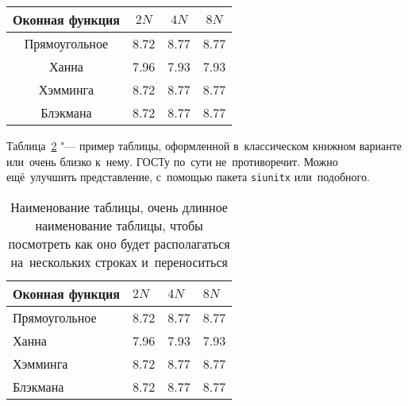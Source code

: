 \begin{table} [htbp]%
  \centering
  \begin{threeparttable}%
    \caption{}%
    \label{tab:test1}%
    \begin{SingleSpace}
      \begin{tabular}{| c | c | c | c |}
        \hline
        Оконная функция & \({2N}\)& \({4N}\)& \({8N}\)\\ \hline
        Прямоугольное   & 8.72  & 8.77  & 8.77  \\ \hline
        Ханна           & 7.96  & 7.93  & 7.93  \\ \hline
        Хэмминга        & 8.72  & 8.77  & 8.77  \\ \hline
        Блэкмана        & 8.72  & 8.77  & 8.77  \\ \hline
      \end{tabular}%
    \end{SingleSpace}
  \end{threeparttable}
\end{table}

Таблица~\ref{tab:test2} "--- пример таблицы, оформленной в~классическом книжном
варианте или~очень близко к~нему. \mbox{ГОСТу} по~сути не~противоречит. Можно
ещё~улучшить представление, с~помощью пакета \verb|siunitx| или~подобного.

\begin{table} [htbp]%
    \centering
    \caption{Наименование таблицы, очень длинное наименование таблицы, чтобы посмотреть как оно будет располагаться на~нескольких строках и~переноситься}%
    \label{tab:test2}%
    \renewcommand{\arraystretch}{1.5}%
    \begin{SingleSpace}
        \begin{tabular}{@{}@{\extracolsep{20pt}}llll@{}} %
            \toprule     %
            Оконная функция & \({2N}\)& \({4N}\)& \({8N}\)\\
            \midrule %
            Прямоугольное   & 8.72  & 8.77  & 8.77  \\
            Ханна           & 7.96  & 7.93  & 7.93  \\
            Хэмминга        & 8.72  & 8.77  & 8.77  \\
            Блэкмана        & 8.72  & 8.77  & 8.77  \\
            \bottomrule %
        \end{tabular}%
    \end{SingleSpace}
\end{table}

